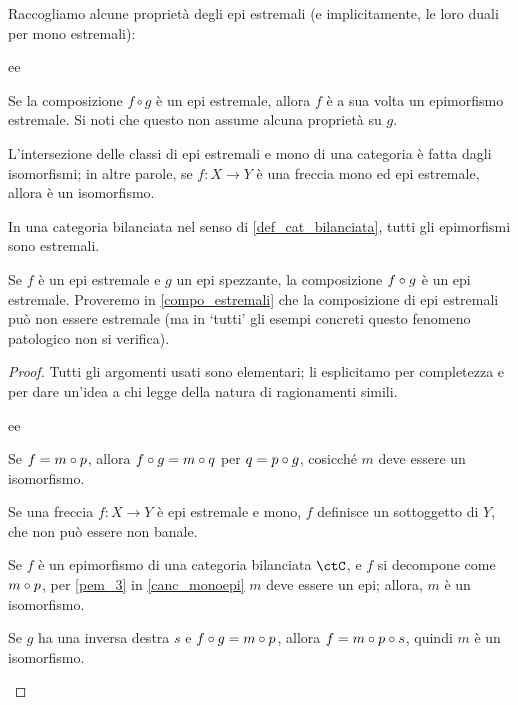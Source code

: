 \begin{proposition}
	Raccogliamo alcune proprietà degli epi estremali (e implicitamente, le loro duali per mono estremali):
	\begin{enumtag}{ee}
		\item \label{ee_1} Se la composizione \(f \circ g\) è un epi estremale, allora \(f\) è a sua volta un epimorfismo estremale. Si noti che questo non assume alcuna proprietà su $g$.
		\item \label{ee_2} L'intersezione delle classi di epi estremali e mono di una categoria è fatta dagli isomorfismi; in altre parole, se \(f : X\to Y\) è una freccia mono ed epi estremale, allora è un isomorfismo.
		\item \label{ee_3} In una categoria bilanciata nel senso di \ref{def_cat_bilanciata}, tutti gli epimorfismi sono estremali.
		\item \label{ee_4} Se $f$ è un epi estremale e $g$ un epi spezzante, la composizione $f\circ g$ è un epi estremale. Proveremo in \ref{compo_estremali} che la composizione di epi estremali può non essere estremale (ma in `tutti' gli esempi concreti questo fenomeno patologico non si verifica).
	\end{enumtag}
\end{proposition}
\begin{proof}
	Tutti gli argomenti usati sono elementari; li esplicitamo per completezza e per dare un'idea a chi legge della natura di ragionamenti simili.
	\begin{enumtag}{ee}
		\item Se $f = m \circ p$, allora $f\circ g = m\circ q$ per $q = p\circ g$, cosicché $m$ deve essere un isomorfismo.
		\item Se una freccia $f : X\to Y$ è epi estremale e mono, $f$ definisce un sottoggetto di $Y$, che non può essere non banale.
		\item Se $f$ è un epimorfismo di una categoria bilanciata $\ctC$, e $f$ si decompone come $m\circ p$, per \ref{pem_3} in \ref{canc_monoepi} $m$ deve essere un epi; allora, $m$ è un isomorfismo.
		\item Se $g$ ha una inversa destra $s$ e $f\circ g = m\circ p$, allora $f = m\circ p\circ s$, quindi $m$ è un isomorfismo.
	\end{enumtag}
\end{proof}
